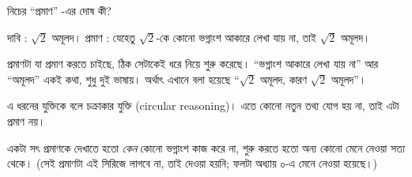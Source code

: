 \documentclass[11pt]{article}
\begin{document}
 নিচের ``প্রমাণ'' -এর দোষ কী?

\smallskip
\noindent
দাবি : $\sqrt{2}$ অমূলদ।
প্রমাণ : যেহেতু $\sqrt{2}$-কে কোনো ভগ্নাংশ আকারে লেখা যায় না, তাই
$\sqrt{2}$ অমূলদ।

\begin{sol}
প্রমাণটা যা প্রমাণ করতে চাইছে, ঠিক সেটাকেই ধরে নিয়ে শুরু করেছে। ``ভগ্নাংশ
আকারে লেখা যায় না'' আর ``অমূলদ'' একই কথা, শুধু দুই ভাষায়। অর্থাৎ এখানে বলা
হয়েছে ``$\sqrt{2}$ অমূলদ, কারণ $\sqrt{2}$ অমূলদ''।

এ ধরনের যুক্তিকে বলে চক্রাকার যুক্তি (circular reasoning)। এতে কোনো নতুন
তথ্য যোগ হয় না, তাই এটা প্রমাণ নয়।

একটা সৎ প্রমাণকে দেখাতে হতো \emph{কেন} কোনো ভগ্নাংশ কাজ করে না, শুরু করতে হতো
অন্য কোনো মেনে নেওয়া সত্য থেকে। (সেই প্রমাণটা এই সিরিজে লাগবে না, তাই দেওয়া
হয়নি; ফলটা অধ্যায় ০-এ মেনে নেওয়া হয়েছে।)
\end{sol}
\end{document}
